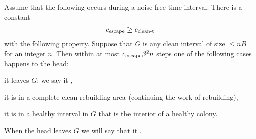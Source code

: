 \documentclass[12pt]{memoir}
\renewcommand{\le}{\leq}
\renewcommand{\ge}{\geq}
\def\B{B}
\def\G{G}
\newcommand{\cns}[1]{c_{\textrm{\upshape #1}}}
\newcommand{\cEsc}{\cns{escape}}
\newcommand{\cCleanT}{\cns{clean-t}}
\begin{document}
\begin{lemma}\label{lem:clean-esc}
Assume that the following occurs during a noise-free time interval.
 There is a constant
\begin{align}\label{eq:cns.clean-esc}
  \cEsc \ge\cCleanT 
 \end{align}
with the following property.
Suppose that \( \G \) is any clean interval of size \( \le n\B \) for an integer \( n \).
Then within at most \( \cEsc  \beta^{2}n \) steps one of the following
cases happens to the head:
\begin{Alphenum}
  \item\label{i:clean-esc.leave}  it leaves \( G \): we say it ,
  \item\label{i:clean-esc.rebuild} it is in a complete clean rebuilding area (continuing the work of rebuilding),
  \item\label{i:clean-esc.healthy} it is in a healthy interval in \( G \)
that is the interior of a healthy colony. 
\end{Alphenum}
\end{lemma}
When the head leaves \( \G \) we will say that it .
\end{document}

